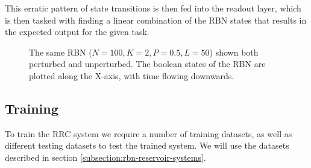 This erratic pattern of state transitions is then fed into the readout layer,
which is then tasked with finding a linear combination of the RBN states that results in the expected output for the given task.

\begin{figure}
  \caption{
    The same RBN ($N=100, K=2, P=0.5, L=50$) shown both perturbed and unperturbed.
    The boolean states of the RBN are plotted along the X-axis,
    with time flowing downwards.
  }
\end{figure}

\subsection{Training}

To train the RRC system we require a number of training datasets,
as well as different testing datasets to test the trained system.
We will use the datasets described in section \ref{subsection:rbn-reservoir-systems}.

